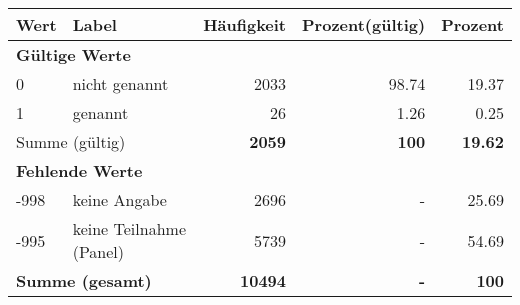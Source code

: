      \begin{longtable}{lXrrr}
     \toprule
     \textbf{Wert} & \textbf{Label} & \textbf{Häufigkeit} & \textbf{Prozent(gültig)} & \textbf{Prozent} \\
     \endhead
     \midrule
     \multicolumn{5}{l}{\textbf{Gültige Werte}}\\

     0 &
     \multicolumn{1}{X}{ nicht genannt   } &


       \num{2033} &
       \num[round-mode=places,round-precision=2]{98,74} &
         \num[round-mode=places,round-precision=2]{19,37} \\

     1 &
     \multicolumn{1}{X}{ genannt   } &


       \num{26} &
       \num[round-mode=places,round-precision=2]{1,26} &
         \num[round-mode=places,round-precision=2]{0,25} \\
     \midrule
     \multicolumn{2}{l}{Summe (gültig)} &
       \textbf{\num{2059}} &
     \textbf{100} &
       \textbf{\num[round-mode=places,round-precision=2]{19,62}} \\
     \multicolumn{5}{l}{\textbf{Fehlende Werte}}\\
       -998 &
       keine Angabe &
         \num{2696} &
        - &
         \num[round-mode=places,round-precision=2]{25,69} \\
       -995 &
       keine Teilnahme (Panel) &
         \num{5739} &
        - &
         \num[round-mode=places,round-precision=2]{54,69} \\
     \midrule
     \multicolumn{2}{l}{\textbf{Summe (gesamt)}} &
          \textbf{\num{10494}} &
        \textbf{-} &
        \textbf{100} \\
     \bottomrule
     \end{longtable}
     
